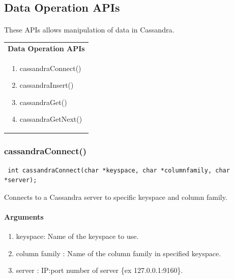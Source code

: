 \subsection{Data Operation APIs} 
\paragraph{}These APIs allows  manipulation of data in Cassandra.

\begin{tabular}{ p{7cm} }

    {\bf Data Operation APIs}     \\
 

\begin{enumerate}
\item cassandraConnect()
   \item cassandraInsert()
   \item cassandraGet()
   \item cassandraGetNext()
   \end{enumerate} 
\end{tabular}







\subsubsection{cassandraConnect()}
\begin{verbatim}
 int cassandraConnect(char *keyspace, char *columnfamily, char *server);
\end{verbatim}

  Connects to a Cassandra server to specific keyspace and column family.

  \paragraph{Arguments}
  \begin{enumerate}
   \item keyspace: Name of the keyspace to use.
   \item column family : Name of the column family in specified keyspace.
   \item server :       IP:port number of server \{ex 127.0.0.1:9160\}.
  \end{enumerate}

